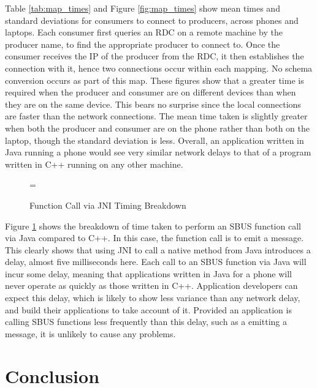 \documentclass[12pt,twoside,notitlepage]{report}
\begin{document}
Table \ref{tab:map_times} and Figure \ref{fig:map_times} show mean times and standard deviations for consumers to connect to producers, across phones and laptops.
Each consumer first queries an RDC on a remote machine by the producer name, to find the appropriate producer to connect to. 
Once the consumer receives the IP of the producer from the RDC, it then establishes the connection with it, hence two connections occur within each mapping. 
No schema conversion occurs as part of this map. 
These figures show that a greater time is required when the producer and consumer are on different devices than when they are on the same device. 
This bears no surprise since the local connections are faster than the network connections. 
The mean time taken is slightly greater when both the producer and consumer are on the phone rather than both on the laptop, though the standard deviation is less. 
Overall, an application written in Java running a phone would see very similar network delays to that of a program written in C++ running on any other machine.

\begin{figure}[tbh]
\epsfxsize=\hsize
\centerline{}
\caption{Function Call via JNI Timing Breakdown}
\label{fig:jni_times}
\end{figure}

Figure \ref{fig:jni_times} shows the breakdown of time taken to perform an SBUS function call via Java compared to C++. 
In this case, the function call is to emit a message. 
This clearly shows that using JNI to call a native method from Java introduces a delay, almost five milliseconds here. 
Each call to an SBUS function via Java will incur some delay, meaning that applications written in Java for a phone will never operate as quickly as those written in C++.
Application developers can expect this delay, which is likely to show less variance than any network delay, and build their applications to take account of it. 
Provided an application is calling SBUS functions less frequently than this delay, such as a emitting a message, it is unlikely to cause any problems.




\cleardoublepage

\chapter{Conclusion}
\end{document}
